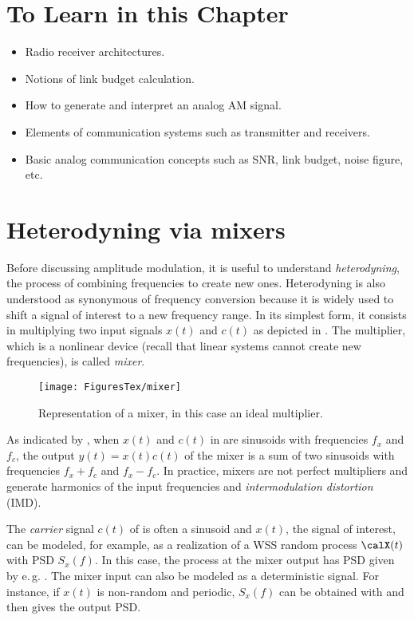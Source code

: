 \section{To Learn in this Chapter}

\begin{itemize}
	\item Radio receiver architectures.
	\item Notions of link budget calculation.
	\item How to generate and interpret an analog AM signal.
\item Elements of communication systems such as transmitter and receivers.
	\item Basic analog communication concepts such as SNR, link budget, noise figure, etc.
\end{itemize}	

\section{Heterodyning via mixers}

Before discussing amplitude modulation, it is useful to understand \emph{heterodyning}, the process of combining frequencies to create new ones. Heterodyning is also understood as synonymous of frequency conversion because it is widely used to shift a signal of interest to a new frequency range. In its simplest form, it consists in multiplying two input signals $x(t)$ and $c(t)$ as depicted in . The multiplier, which is a nonlinear device (recall that linear systems cannot create new frequencies), is called \emph{mixer}. 

\begin{figure}[htbp]
\centering
\texttt{[image: FiguresTex/mixer]}
\caption{Representation of a mixer, in this case an ideal multiplier.\label{fig:mixer}}
\end{figure}

As indicated by , when $x(t)$ and $c(t)$ in  are sinusoids with frequencies $f_x$ and $f_c$, the output $y(t)=x(t)c(t)$ of the mixer is a sum of two sinusoids with frequencies $f_x+f_c$ and $f_x-f_c$. In practice, mixers are not perfect multipliers and generate harmonics of the input frequencies and \emph{intermodulation distortion} (IMD).

The \emph{carrier} signal $c(t)$ of  is often a sinusoid and $x(t)$, the signal of interest, can be modeled, for example, as a realization of a WSS random process $\calX(t)$ 
with PSD $S_x(f)$. In this case, the process at the mixer output has PSD given by e.\,g. .
The mixer input can also be modeled as a deterministic signal.
For instance, if $x(t)$ is non-random and periodic, $S_x(f)$ can be obtained with  and then  gives the output PSD.

